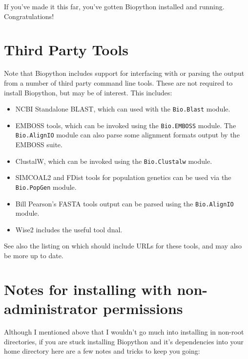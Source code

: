 \documentclass{article}
\begin{document}
If you've made it this far, you've gotten Biopython installed and running.
Congratulations!

\section{Third Party Tools}

Note that Biopython includes support for interfacing with or parsing the output from a number of third party command line tools.  These are not required to install Biopython, but may be of interest.  This includes:

\begin{itemize}
\item NCBI Standalone BLAST, which can used with the \verb|Bio.Blast| module.
\item EMBOSS tools, which can be invoked using the \verb|Bio.EMBOSS| module.  The \verb|Bio.AlignIO| module can also parse some alignment formats output by the EMBOSS suite.
\item ClustalW, which can be invoked using the \verb|Bio.Clustalw| module.
\item SIMCOAL2 and FDist tools for population genetics can be used via the \verb|Bio.PopGen| module.
\item Bill Pearson's FASTA tools output can be parsed using the \verb|Bio.AlignIO| module.
\item Wise2 includes the useful tool dnal.
\end{itemize}

\noindent
See also the listing on  which should include URLs for these tools, and may also be more up to date.

\section{Notes for installing with non-administrator permissions}

Although I mentioned above that I wouldn't go much into installing in
non-root directories, if you are stuck installing
Biopython and it's dependencies into your home directory here are a
few notes and tricks to keep you going:
\end{document}
